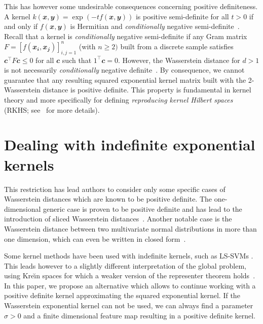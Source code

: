 This has however some undesirable consequences concerning positive definiteness.
A kernel $k(\mathbfit{x},\mathbfit{y})=\exp\left( - t f(\mathbfit{x},\mathbfit{y})\right)$ is positive semi-definite for all $t>0$ if and only if $f(\mathbfit{x},\mathbfit{y})$ is Hermitian and \emph{conditionally} negative semi-definite~\cite{Berg1984}. Recall that a kernel is \emph{conditionally} negative semi-definite if any Gram matrix $F = [f(\mathbfit{x_i},\mathbfit{x_j})]_{i,j =1}^n$ (with $n\geq 2)$ built from a discrete sample satisfies $\mathbfit{c}^\top F \mathbfit{c}\leq 0$ for all $\mathbfit{c}$ such that $\mathbfit{1}^\top \mathbfit{c} =0$. However, the Wasserstein distance for $d>1$ is not necessarily \emph{conditionally} negative definite~\cite{GabrielPeyre2019COTW}. By consequence, we cannot guarantee that any resulting squared exponential kernel matrix built with the 2-Wasserstein distance is positive definite. This property is fundamental in kernel theory and more specifically for defining \emph{reproducing kernel Hilbert spaces} (RKHS; see~\cite{Scholkopf:2001:LKS:559923} for more details).


\section{Dealing with indefinite exponential kernels}
This restriction has lead authors to consider only some specific cases of Wasserstein distances which are known to be positive definite. The one-dimensional generic case is proven to be positive definite and has lead to the introduction of sliced Wasserstein distances~\cite{Carriere2017,SlicedWasserstein}. Another notable case is the Wasserstein distance between two multivariate normal distributions in more than one dimension, which can even be written in closed form~\cite{GabrielPeyre2019COTW}.

Some kernel methods have been used with indefinite kernels, such as LS-SVMs \cite{suykens:worldsci2002,Huang2017}. This leads however to a slightly different interpretation of the global problem, using Kre\u{\i}n spaces for which a weaker version of the representer theorem holds~\cite{Ong2004}. In this paper, we propose an alternative which allows to continue working with a positive definite kernel approximating the squared exponential kernel. If the Wasserstein exponential kernel can not be used, we can always find a parameter $\sigma>0$ and a finite dimensional feature map resulting in a positive definite kernel.

